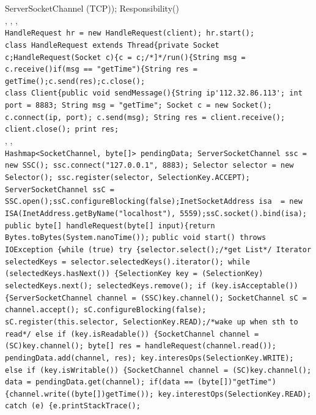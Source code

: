 ServerSocketChannel (TCP));
Responsibility()
\\
\textbar
{} , 
, 
 ,
 
\\
\lstinline{HandleRequest hr = new HandleRequest(client); hr.start();}
\\
\lstinline{class HandleRequest extends Thread{private Socket c;HandleRequest(Socket c){c = c;/*]*/run(){String msg = c.receive()if(msg == "getTime"){String res = getTime();c.send(res);c.close();}
\\
\lstinline{class Client{public void sendMessage(){String ip'112.32.86.113'; int port = 8883; String msg = "getTime"; Socket c = new Socket(); c.connect(ip, port); c.send(msg); String res = client.receive(); client.close(); print res;}
\\
\textbar
{} , 
 ,
 
\\
\lstinline{Hashmap<SocketChannel, byte[]> pendingData; ServerSocketChannel ssc = new SSC(); ssc.connect("127.0.0.1", 8883); Selector selector = new Selector(); ssc.register(selector, SelectionKey.ACCEPT);}
\lstinline{ServerSocketChannel ssC = SSC.open();ssC.configureBlocking(false);InetSocketAddress isa  = new ISA(InetAddress.getByName("localhost"), 5559);ssC.socket().bind(isa);}
\lstinline{public byte[] handleRequest(byte[] input){return Bytes.toBytes(System.nanoTime());}
\lstinline{public void start() throws IOException {while (true) try {selector.select();/*get List*/ Iterator selectedKeys = selector.selectedKeys().iterator(); while (selectedKeys.hasNext()) {SelectionKey key = (SelectionKey) selectedKeys.next(); selectedKeys.remove(); if (key.isAcceptable()) {ServerSocketChannel channel = (SSC)key.channel(); SocketChannel sC = channel.accept(); sC.configureBlocking(false); sC.register(this.selector, SelectionKey.READ);/*wake up when sth to read*/ else if (key.isReadable()) {SocketChannel channel = (SC)key.channel(); byte[] res = handleRequest(channel.read()); pendingData.add(channel, res); key.interesOps(SelectionKey.WRITE); else if (key.isWritable()) {SocketChannel channel = (SC)key.channel(); data = pendingData.get(channel); if(data == (byte[])"getTime"){channel.write((byte[])getTime()); key.interestOps(SelectionKey.READ); catch (e) {e.printStackTrace();}
